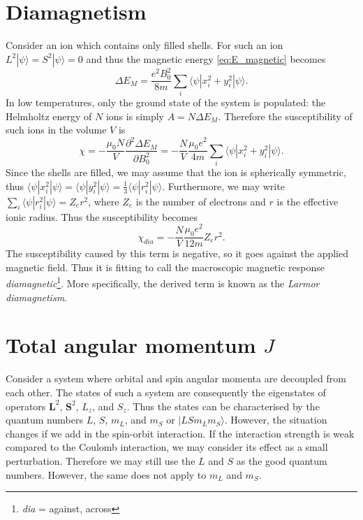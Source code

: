 \section{Diamagnetism}
Consider an ion which contains only filled shells. For such an ion $L^2|\psi\rangle = S^2|\psi\rangle = 0$ and thus the magnetic energy \eqref{eq:E_magnetic} becomes
\begin{equation}
\Delta E_M = \frac{e^2 B_0^2}{8 m}\sum_i \langle \psi | x_i^2 + y_i^2 | \psi \rangle.
\end{equation}
In low temperatures, only the ground state of the system is populated: the Helmholtz energy of $N$ ions is simply $A = N\Delta E_M$. Therefore the susceptibility of such ions in the volume $V$ is
\begin{equation}
\chi = -\frac{\mu_0 N}{V} \frac{\partial^2 \Delta E_M}{\partial B_0^2}
= -\frac{N}{V} \frac{\mu_0 e^2}{4 m}\sum_i \langle \psi | x_i^2 + y_i^2 | \psi \rangle.
\end{equation}
Since the shells are filled, we may assume that the ion is spherically symmetric, thus $\langle \psi | x_i^2| \psi \rangle = \langle \psi | y_i^2 | \psi \rangle = \frac{1}{3} \langle \psi | r_i^2| \psi \rangle $. Furthermore, we may write $\sum_i \langle \psi | r_i^2| \psi \rangle = Z_{e} r^2$, where $Z_{e}$ is the number of electrons and $r$ is the effective ionic radius. Thus the susceptibility becomes
\begin{equation}
\chi_{dia} =  -\frac{N}{V} \frac{\mu_0  e^2}{12 m} Z_{e} r^2.
\end{equation}
The susceptibility caused by this term is negative, so it goes against the applied magnetic field. Thus it is fitting to call the macroscopic magnetic response \emph{diamagnetic}\footnote{\emph{dia} = against, across}. More specifically, the derived term is known as the \emph{Larmor diamagnetism}.


\section{Total angular momentum $J$}
Consider a system where orbital and spin angular momenta are decoupled from each other. The states of such a system are consequently the eigenstates of operators $\mathbf{L}^2$, $\mathbf{S}^2$, $L_z$, and  $S_z$. Thus the states can be characterised by the quantum numbers $L$, $S$, $m_L$, and $m_S$  or $|LSm_Lm_S\rangle$. 
However, the situation changes if we add in the spin-orbit interaction. If the interaction strength is weak compared to the Coulomb interaction, we may consider its effect as a small perturbation. Therefore we may still use the $L$ and $S$ as the good quantum numbers. However, the same does not apply to $m_L$ and $m_S$. 

